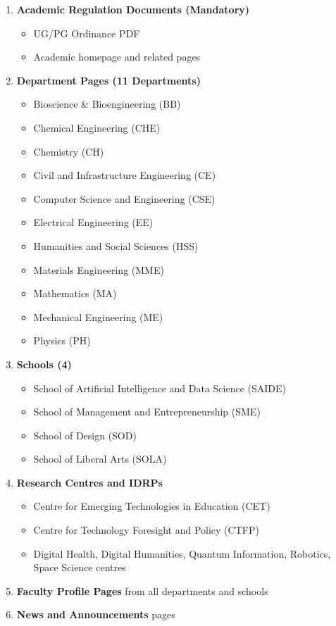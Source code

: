 \documentclass[12pt,a4paper]{article}
\begin{document}
\begin{enumerate}
    \item \textbf{Academic Regulation Documents (Mandatory)}
    \begin{itemize}
        \item UG/PG Ordinance PDF
        \item Academic homepage and related pages
    \end{itemize}

    \item \textbf{Department Pages (11 Departments)}
    \begin{itemize}
        \item Bioscience \& Bioengineering (BB)
        \item Chemical Engineering (CHE)
        \item Chemistry (CH)
        \item Civil and Infrastructure Engineering (CE)
        \item Computer Science and Engineering (CSE)
        \item Electrical Engineering (EE)
        \item Humanities and Social Sciences (HSS)
        \item Materials Engineering (MME)
        \item Mathematics (MA)
        \item Mechanical Engineering (ME)
        \item Physics (PH)
    \end{itemize}

    \item \textbf{Schools (4)}
    \begin{itemize}
        \item School of Artificial Intelligence and Data Science (SAIDE)
        \item School of Management and Entrepreneurship (SME)
        \item School of Design (SOD)
        \item School of Liberal Arts (SOLA)
    \end{itemize}

    \item \textbf{Research Centres and IDRPs}
    \begin{itemize}
        \item Centre for Emerging Technologies in Education (CET)
        \item Centre for Technology Foresight and Policy (CTFP)
        \item Digital Health, Digital Humanities, Quantum Information, Robotics, Space Science centres
    \end{itemize}

    \item \textbf{Faculty Profile Pages} from all departments and schools

    \item \textbf{News and Announcements} pages
\end{enumerate}
\end{document}
